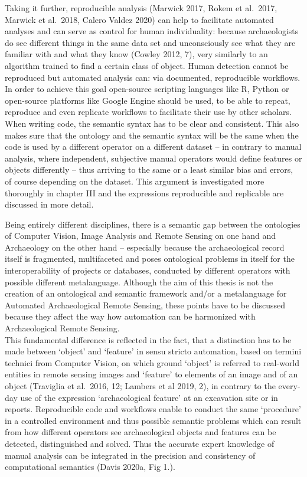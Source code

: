 \documentclass[
]{article}
\begin{document}
Taking it further, reproducible analysis (Marwick 2017, Rokem et al.~2017, Marwick et al.~2018, Calero Valdez 2020) can help to facilitate automated analyses and can serve as control for human individuality: because archaeologists do see different things in the same data set and unconsciously see what they are familiar with and what they know (Cowley 2012, 7), very similarly to an algorithm trained to find a certain class of object. Human detection cannot be reproduced but automated analysis can: via documented, reproducible workflows. In order to achieve this goal open-source scripting languages like R, Python or open-source platforms like Google Engine should be used, to be able to repeat, reproduce and even replicate workflows to facilitate their use by other scholars. When writing code, the semantic syntax has to be clear and consistent. This also makes sure that the ontology and the semantic syntax will be the same when the code is used by a different operator on a different dataset -- in contrary to manual analysis, where independent, subjective manual operators would define features or objects differently -- thus arriving to the same or a least similar bias and errors, of course depending on the dataset. This argument is investigated more thoroughly in chapter III and the expressions reproducible and replicable are discussed in more detail.

Being entirely different disciplines, there is a semantic gap between the ontologies of Computer Vision, Image Analysis and Remote Sensing on one hand and Archaeology on the other hand -- especially because the archaeological record itself is fragmented, multifaceted and poses ontological problems in itself for the interoperability of projects or databases, conducted by different operators with possible different metalanguage. Although the aim of this thesis is not the creation of an ontological and semantic framework and/or a metalanguage for Automated Archaeological Remote Sensing, these points have to be discussed because they affect the way how automation can be harmonized with Archaeological Remote Sensing.\\
This fundamental difference is reflected in the fact, that a distinction has to be made between `object' and `feature' in sensu stricto automation, based on termini technici from Computer Vision, on which ground `object' is referred to real-world entities in remote sensing images and `feature' to elements of an image and of an object (Traviglia et al.~2016, 12; Lambers et al 2019, 2), in contrary to the every-day use of the expression `archaeological feature' at an excavation site or in reports. Reproducible code and workflows enable to conduct the same `procedure' in a controlled environment and thus possible semantic problems which can result from how different operators see archaeological objects and features can be detected, distinguished and solved. Thus the accurate expert knowledge of manual analysis can be integrated in the precision and consistency of computational semantics (Davis 2020a, Fig 1.).
\end{document}
